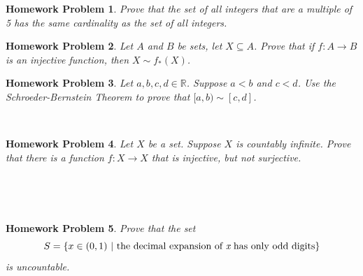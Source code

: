 \documentclass{article}
\newtheorem{hw}{Homework Problem}
\newcommand{\R}{\mathbb{R}}
\newcommand{\N}{\mathbb{N}}
\newcommand{\be}{\begin{enumerate}}
\newcommand{\ee}{\end{enumerate}}
\begin{document}


	\begin{hw}
		Prove that the set of all integers that are a multiple of 5 has the same cardinality as the set of all integers.
	\end{hw}
	\begin{hw}
		Let $A$ and $B$ be sets, let $X\subseteq A$. Prove that if $f:A \rightarrow B$ is an injective function, then $X \sim f_*(X)$.
	\end{hw}
	\begin{hw}
		Let $a, b, c, d \in \R$. Suppose $a<b$ and $c<d$. Use the Schroeder-Bernstein Theorem to prove that  $[a,b) \sim [c,d]$.
	\end{hw}

	\underline{\hspace{5in}}


	\
	\begin{hw}
		Let $X$ be a set. Suppose $X$ is countably infinite. Prove that there is a function $f:X \rightarrow X$  that is injective, but not surjective.
	\end{hw}

	\
	\underline{\hspace{5in}}


	\

	\begin{hw}
		Prove that the set $$S = \{ x \in (0, 1) \ | \ \textrm{the decimal expansion of {\it x}  has only odd digits} \}$$ is uncountable.
	\end{hw}
	\underline{\hspace{5in}}

\end{document}
